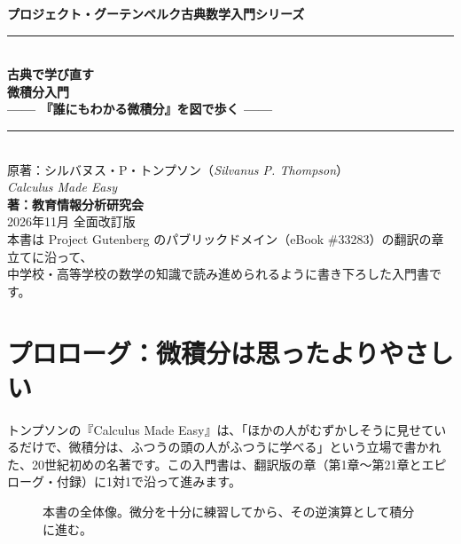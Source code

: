 \documentclass[a4paper,11pt,openany]{ltjsbook}
\begin{document}
\begin{titlepage}
\begin{center}
\vspace*{1.5cm}
{\Large\bfseries プロジェクト・グーテンベルク古典数学入門シリーズ}\\[0.8cm]
\rule{\textwidth}{1.5pt}\\[0.4cm]
{\Huge\bfseries 古典で学び直す\\微積分入門}\\[0.4cm]
{\Large\bfseries —— 『誰にもわかる微積分』を図で歩く ——}\\[0.4cm]
\rule{\textwidth}{1.5pt}\\[1.5cm]
{\large 原著：シルバヌス・P・トンプソン（\textit{Silvanus P. Thompson}）\\
\textit{Calculus Made Easy}}\\[2.0cm]
{\Large\bfseries 著：教育情報分析研究会}\\[2.5cm]
\vfill
{\large 2026年11月 全面改訂版}\\[0.5cm]
{\footnotesize 本書は Project Gutenberg のパブリックドメイン（eBook \#33283）の翻訳の章立てに沿って、\\
中学校・高等学校の数学の知識で読み進められるように書き下ろした入門書です。}
\end{center}
\end{titlepage}

\frontmatter
\tableofcontents
\mainmatter

\chapter*{プロローグ：微積分は思ったよりやさしい}

トンプソンの『Calculus Made Easy』は、「ほかの人がむずかしそうに見せているだけで、微積分は、ふつうの頭の人がふつうに学べる」という立場で書かれた、20世紀初めの名著です。この入門書は、翻訳版の章（第1章〜第21章とエピローグ・付録）に1対1で沿って進みます。

\begin{figure}[htbp]
\centering
{}
\caption{本書の全体像。微分を十分に練習してから、その逆演算として積分に進む。}
\end{figure}
\end{document}

